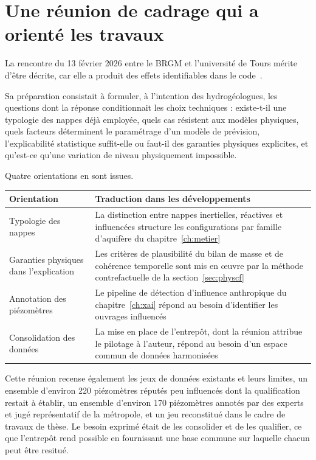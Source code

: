 \section{Une réunion de cadrage qui a orienté les travaux}

La rencontre du 13 février 2026 entre le BRGM et l'université de Tours mérite d'être décrite,
car elle a produit des effets identifiables dans le code~\cite{reunion_aida}.

Sa préparation consistait à formuler, à l'intention des hydrogéologues, les questions dont la
réponse conditionnait les choix techniques : existe-t-il une typologie des nappes déjà employée,
quels cas résistent aux modèles physiques, quels facteurs déterminent le paramétrage d'un modèle
de prévision, l'explicabilité statistique suffit-elle ou faut-il des garanties physiques
explicites, et qu'est-ce qu'une variation de niveau physiquement impossible.

Quatre orientations en sont issues.

\begin{center}
\begin{tabularx}{\textwidth}{@{}lX@{}}
\toprule
\textbf{Orientation} & \textbf{Traduction dans les développements} \\
\midrule
Typologie des nappes & La distinction entre nappes inertielles, réactives et influencées
structure les configurations par famille d'aquifère du chapitre~\ref{ch:metier} \\
Garanties physiques dans l'explication & Les critères de plausibilité du bilan de masse et de
cohérence temporelle sont mis en \oe uvre par la méthode contrefactuelle de la
section~\ref{sec:physcf} \\
Annotation des piézomètres & Le pipeline de détection d'influence anthropique du
chapitre~\ref{ch:xai} répond au besoin d'identifier les ouvrages influencés \\
Consolidation des données & La mise en place de l'entrepôt, dont la réunion attribue le pilotage
à l'auteur, répond au besoin d'un espace commun de données harmonisées \\
\bottomrule
\end{tabularx}
\end{center}

Cette réunion recense également les jeux de données existants et leurs limites, un ensemble
d'environ \num{220} piézomètres réputés peu influencés dont la qualification restait à établir,
un ensemble d'environ \num{170} piézomètres annotés par des experts et jugé représentatif de la
métropole, et un jeu reconstitué dans le cadre de travaux de thèse. Le besoin exprimé était de
les consolider et de les qualifier, ce que l'entrepôt rend possible en fournissant une base
commune sur laquelle chacun peut être resitué.

